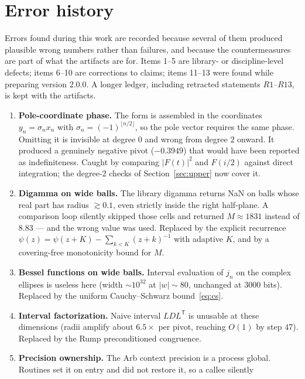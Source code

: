 \documentclass[11pt,a4paper]{article}
\theoremstyle{definition}
\theoremstyle{remark}
\begin{document}
\appendix

\section{Error history}
\label{app:errors}

Errors found during this work are recorded because several of them produced
plausible wrong numbers rather than failures, and because the countermeasures
are part of what the artifacts are for. Items 1--5 are library- or
discipline-level defects; items 6--10 are corrections to claims; items 11--13
were found while preparing version $2.0.0$. A longer ledger,
including retracted statements $R1$--$R13$, is kept with the artifacts.

\begin{enumerate}
\item \textbf{Pole-coordinate phase.} The form is assembled in the coordinates
  $y_n = \sigma_n x_n$ with $\sigma_n = (-1)^{\lfloor n/2\rfloor}$, so the pole
  vector requires the same phase. Omitting it is invisible at degree $0$ and
  wrong from degree $2$ onward. It produced a genuinely negative pivot
  ($-0.3949$) that would have been reported as indefiniteness. Caught by
  comparing $|F(t)|^2$ and $F(i/2)$ against direct integration; the degree-$2$
  checks of Section~\ref{sec:upper} now cover it.
\item \textbf{Digamma on wide balls.} The library digamma returns NaN on balls
  whose real part has radius $\gtrsim 0.1$, even strictly inside the right
  half-plane. A comparison loop silently skipped those cells and returned
  $M \approx 1831$ instead of $8.83$ --- and the wrong value was used. Replaced
  by the explicit recurrence $\psi(z) = \psi(z+K) - \sum_{k<K}(z+k)^{-1}$ with
  adaptive $K$, and by a covering-free monotonicity bound for $M$.
\item \textbf{Bessel functions on wide balls.} Interval evaluation of $j_n$ on
  the complex ellipses is useless here (width $\sim10^{32}$ at $|w|\sim80$,
  unchanged at $3000$ bits). Replaced by the uniform
  Cauchy--Schwarz bound~\eqref{eq:cs}.
\item \textbf{Interval factorization.} Naive interval $LDL^{\mathsf T}$ is
  unusable at these dimensions (radii amplify about $6.5\times$ per pivot,
  reaching $O(1)$ by step $47$). Replaced by the Rump preconditioned congruence.
\item \textbf{Precision ownership.} The Arb context precision is a process
  global. Routines set it on entry and did not restore it, so a callee silently

\end{enumerate}
\end{document}
